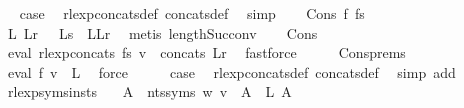 \begin{isabellebody}
\ \isamarkupfalse%
\ {\isacharquery}{\kern0pt}case\ \isamarkupfalse%
\ rlexp{\isacharunderscore}{\kern0pt}concats{\isacharunderscore}{\kern0pt}def\ concats{\isacharunderscore}{\kern0pt}def\ \isamarkupfalse%
\ simp\isanewline
{}\isamarkupfalse%
\isanewline
\ \ \isamarkupfalse%
\ {\isacharparenleft}{\kern0pt}Cons\ f{}\ fs{\isacharparenright}{\kern0pt}\isanewline
\ \ \isamarkupfalse%
\ \isamarkupfalse%
\ L{}\ Lr\ \ {\isacharasterisk}{\kern0pt}{\isacharcolon}{\kern0pt}\ {\isachardoublequoteopen}Ls\ {\isacharequal}{\kern0pt}\ L{}{\isacharhash}{\kern0pt}Lr{\isachardoublequoteclose}\ \isamarkupfalse%
\ {\isacharparenleft}{\kern0pt}metis\ length{\isacharunderscore}{\kern0pt}Suc{\isacharunderscore}{\kern0pt}conv{\isacharparenright}{\kern0pt}\isanewline
\ \ \isamarkupfalse%
\ Cons\ \isamarkupfalse%
\ {\isachardoublequoteopen}eval\ {\isacharparenleft}{\kern0pt}rlexp{\isacharunderscore}{\kern0pt}concats\ fs{\isacharparenright}{\kern0pt}\ v\ {\isacharequal}{\kern0pt}\ concats\ Lr{\isachardoublequoteclose}\ \isamarkupfalse%
\ fastforce\isanewline
\ \ \isamarkupfalse%
\ \isamarkupfalse%
\ Cons{\isachardot}{\kern0pt}prems\ {\isacharasterisk}{\kern0pt}\ \isamarkupfalse%
\ {\isachardoublequoteopen}eval\ f{}\ v\ {\isacharequal}{\kern0pt}\ L{}{\isachardoublequoteclose}\ \isamarkupfalse%
\ force\isanewline
\ \ \isamarkupfalse%
\ \isamarkupfalse%
\ {\isacharquery}{\kern0pt}case\ \isamarkupfalse%
\ rlexp{\isacharunderscore}{\kern0pt}concats{\isacharunderscore}{\kern0pt}def\ concats{\isacharunderscore}{\kern0pt}def\ \isamarkupfalse%
\ {\isacharparenleft}{\kern0pt}simp\ add{\isacharcolon}{\kern0pt}\ {\isachardoublequoteopen}{\isacharasterisk}{\kern0pt}{\isachardoublequoteclose}{\isacharparenright}{\kern0pt}\isanewline
{}\isamarkupfalse%
%
\endisatagproof
{\isafoldproof}%
%
\isadelimproof
\isanewline
%
\endisadelimproof
\isanewline
{}\isamarkupfalse%
\ rlexp{\isacharunderscore}{\kern0pt}syms{\isacharunderscore}{\kern0pt}insts{\isacharcolon}{\kern0pt}\isanewline
\ \ \ {\isachardoublequoteopen}{\isasymforall}A\ {\isasymin}\ nts{\isacharunderscore}{\kern0pt}syms\ w{\isachardot}{\kern0pt}\ v\ {\isacharparenleft}{\kern0pt}{\isasymgamma}{\isacharprime}{\kern0pt}\ A{\isacharparenright}{\kern0pt}\ {\isacharequal}{\kern0pt}\ L\ A{\isachardoublequoteclose}\isanewline

\end{isabellebody}
